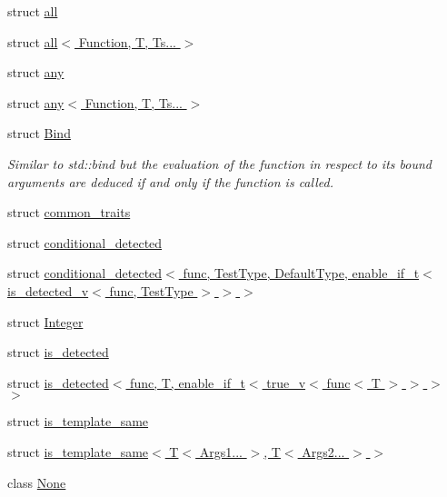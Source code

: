 \begin{DoxyCompactItemize}
\item 
struct \hyperlink{structbc_1_1traits_1_1all}{all}
\item 
struct \hyperlink{structbc_1_1traits_1_1all_3_01Function_00_01T_00_01Ts_8_8_8_01_4}{all$<$ Function, T, Ts... $>$}
\item 
struct \hyperlink{structbc_1_1traits_1_1any}{any}
\item 
struct \hyperlink{structbc_1_1traits_1_1any_3_01Function_00_01T_00_01Ts_8_8_8_01_4}{any$<$ Function, T, Ts... $>$}
\item 
struct \hyperlink{structbc_1_1traits_1_1Bind}{Bind}
\begin{DoxyCompactList}\small\item\em Similar to std\+::bind but the evaluation of the function in respect to its bound arguments are deduced if and only if the function is called. \end{DoxyCompactList}\item 
struct \hyperlink{structbc_1_1traits_1_1common__traits}{common\+\_\+traits}
\item 
struct \hyperlink{structbc_1_1traits_1_1conditional__detected}{conditional\+\_\+detected}
\item 
struct \hyperlink{structbc_1_1traits_1_1conditional__detected_3_01func_00_01TestType_00_01DefaultType_00_01enable_bd91878b3704fd95a7d312facc7e7c31}{conditional\+\_\+detected$<$ func, Test\+Type, Default\+Type, enable\+\_\+if\+\_\+t$<$ is\+\_\+detected\+\_\+v$<$ func, Test\+Type $>$ $>$ $>$}
\item 
struct \hyperlink{structbc_1_1traits_1_1Integer}{Integer}
\item 
struct \hyperlink{structbc_1_1traits_1_1is__detected}{is\+\_\+detected}
\item 
struct \hyperlink{structbc_1_1traits_1_1is__detected_3_01func_00_01T_00_01enable__if__t_3_01true__v_3_01func_3_01T_01_4_01_4_01_4_01_4}{is\+\_\+detected$<$ func, T, enable\+\_\+if\+\_\+t$<$ true\+\_\+v$<$ func$<$ T $>$ $>$ $>$ $>$}
\item 
struct \hyperlink{structbc_1_1traits_1_1is__template__same}{is\+\_\+template\+\_\+same}
\item 
struct \hyperlink{structbc_1_1traits_1_1is__template__same_3_01T_3_01Args1_8_8_8_01_4_00_01T_3_01Args2_8_8_8_01_4_01_4}{is\+\_\+template\+\_\+same$<$ T$<$ Args1... $>$, T$<$ Args2... $>$ $>$}
\item 
class \hyperlink{classbc_1_1traits_1_1None}{None}
\item 

\end{DoxyCompactItemize}

